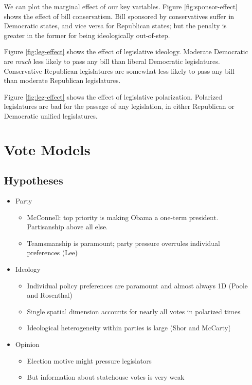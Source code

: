 \documentclass[
  oneside]{book}
\providecommand{\tightlist}{%
  \setlength{\itemsep}{0pt}\setlength{\parskip}{0pt}}
\begin{document}
We can plot the marginal effect of our key variables. Figure \ref{fig:sponsor-effect} shows the effect of bill conservatism. Bill sponsored by conservatives suffer in Democratic states, and vice versa for Republican states; but the penalty is greater in the former for being ideologically out-of-step.

Figure \ref{fig:leg-effect} shows the effect of legislative ideology. Moderate Democratic are \emph{much} less likely to pass any bill than liberal Democratic legislatures. Conservative Republican legislatures are somewhat less likely to pass any bill than moderate Republican legislatures.

Figure \ref{fig:leg-effect} shows the effect of legislative polarization. Polarized legislatures are bad for the passage of any legislation, in either Republican or Democratic unified legislatures.

\hypertarget{vote-models}{%
\chapter{Vote Models}\label{vote-models}}

\hypertarget{hypotheses-1}{%
\section{Hypotheses}\label{hypotheses-1}}

\begin{itemize}
\tightlist
\item
  Party

  \begin{itemize}
  \tightlist
  \item
    McConnell: top priority is making Obama a one-term president. Partisanship above all else.
  \item
    Teamsmanship is paramount; party pressure overrules individual preferences (Lee)
  \end{itemize}
\item
  Ideology

  \begin{itemize}
  \tightlist
  \item
    Individual policy preferences are paramount and almost always 1D (Poole and Rosenthal)
  \item
    Single spatial dimension accounts for nearly all votes in polarized times
  \item
    Ideological heterogeneity within parties is large (Shor and McCarty)
  \end{itemize}
\item
  Opinion

  \begin{itemize}
  \tightlist
  \item
    Election motive might pressure legislators
  \item
    But information about statehouse votes is very weak
  \end{itemize}
\end{itemize}
\end{document}
